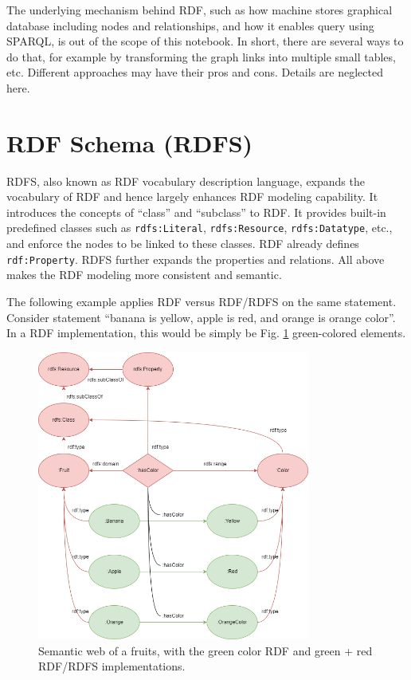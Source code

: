 The underlying mechanism behind RDF, such as how machine stores graphical database including nodes and relationships, and how it enables query using SPARQL, is out of the scope of this notebook. In short, there are several ways to do that, for example by transforming the graph links into multiple small tables, etc. Different approaches may have their pros and cons. Details are neglected here.

\section{RDF Schema (RDFS)}

RDFS, also known as RDF vocabulary description language, expands the vocabulary of RDF and hence largely enhances RDF modeling capability. It introduces the concepts of ``class'' and ``subclass'' to RDF. It provides built-in predefined classes such as \verb|rdfs:Literal|, \verb|rdfs:Resource|, \verb|rdfs:Datatype|, etc., and enforce the nodes to be linked to these classes. RDF already defines \verb|rdf:Property|. RDFS further expands the properties and relations. All above makes the RDF modeling more consistent and semantic.

The following example applies RDF versus RDF/RDFS on the same statement. Consider statement ``banana is yellow, apple is red, and orange is orange color''. In a RDF implementation, this would be simply be Fig. \ref{fig:fruitexp} green-colored elements.
\begin{figure}[htbp]
	\centering
	\includegraphics[width=0.8\textwidth]{./chapters/ch-semanticwebarchitecture/figures/fruitexp.png}
	\caption{Semantic web of a fruits, with the green color RDF and green + red RDF/RDFS implementations.}
	\label{fig:fruitexp}
\end{figure}

